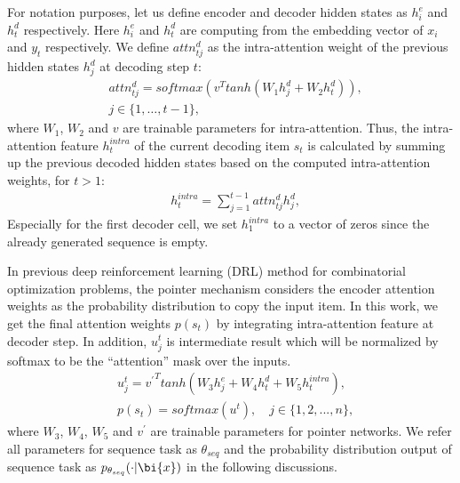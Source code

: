 For notation purposes, let us define encoder and decoder hidden states as $h_{i}^{e}$ and $h_{t}^{d}$ respectively. 
Here $h_{i}^{e}$ and $h_{t}^{d}$ are computing from the embedding vector of $x_{i}$ and $y_{t}$ respectively.
We define $attn_{tj}^{d}$ as the intra-attention weight of the previous hidden states $h_{j}^{d}$ at decoding step $t$:
\begin{eqnarray*}\label{1}
	&attn_{tj}^{d} = softmax(v^{T}tanh(W_{1}h_{j}^{d} + W_{2}h_{t}^{d})),\\& j \in \{1,\dots,t-1\},
\end{eqnarray*}
where $W_{1}$, $W_{2}$ and $v$ are trainable parameters for intra-attention.
Thus, the intra-attention feature $h^{intra}_{t}$ of the current decoding item $s_{t}$ is calculated by summing up the previous decoded hidden states based on the computed intra-attention weights, for $t > 1$: 
\begin{eqnarray*}\label{2}
	&h^{intra}_{t} = \sum_{j=1}^{t-1}{attn_{tj}^{d}h_{j}^{d}},	
\end{eqnarray*}
Especially for the first decoder cell, we set $h^{intra}_{1}$ to a vector of zeros since the already generated sequence is empty.

In previous deep reinforcement learning (DRL) method for combinatorial optimization problems, the pointer mechanism considers the encoder attention weights as the probability distribution to copy the input item. In this work, we get the final attention weights $p(s_{t})$ by integrating intra-attention feature at decoder step. In addition, $u_j^t$ is intermediate result which will be normalized by softmax to be the ``attention'' mask over the inputs. 
\begin{eqnarray*}\label{3}
	&u_{j}^{t} = {v^{'}}^{T}tanh(W_{3}h_{j}^{e} + W_{4}h_{t}^{d} + W_{5}h^{intra}_{t}) \nonumber, \\
	&p(s_{t}) = softmax(u^{t}), \quad j\in\{1,2,...,n\},	 %
\end{eqnarray*}
where $W_{3}$, $W_{4}$, $W_{5}$ and $v^{'}$ are trainable parameters for pointer networks.
We refer all parameters for sequence task as $\theta_{seq}$ and the probability distribution output of sequence task as $p_{\theta_{seq}}(\cdot|\bi{x})$ in the following discussions.

